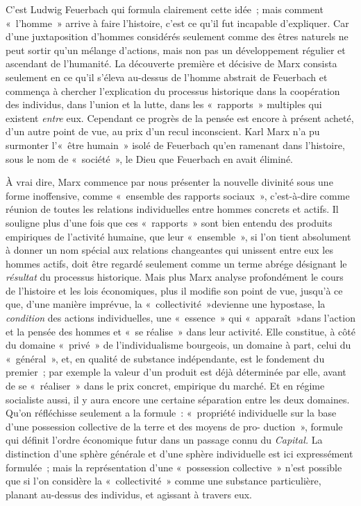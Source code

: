 \documentclass[french,twoside]{book} %
\begin{document}
C'est Ludwig Feuerbach qui formula clairement cette idée ; mais comment « l'homme » arrive à faire l'histoire, c'est ce qu'il fut incapable d'expliquer. Car d'une juxtaposition d'hommes considérés seulement comme des êtres naturels ne peut sortir qu'un mélange d'actions, mais non pas un développement régulier et ascendant de l'humanité. La découverte première et décisive de Marx consista seulement en ce qu'il s'éleva au-dessus de l'homme abstrait de Feuerbach et commença à chercher l'explication du processus historique dans la coopération des individus, dans l'union et la lutte, dans les « rapports » multiples qui existent {\itshape entre} eux. Cependant ce progrès de la pensée est encore à présent acheté, d'un autre point de vue, au prix d'un recul inconscient. Karl Marx n'a pu surmonter l'« être humain » isolé de Feuerbach qu'en ramenant dans l'histoire, sous le nom de « société », le Dieu que Feuerbach en avait éliminé.\par
À vrai dire, Marx commence par nous présenter la nouvelle divinité sous une forme inoffensive, comme « ensemble des rapports sociaux », c'est-à-dire comme réunion de toutes les relations individuelles entre hommes concrets et actifs. Il souligne plus d'une fois que ces « rapports » sont bien entendu des produits empiriques de l'activité humaine, que leur « ensemble », si l'on tient absolument à donner un nom spécial aux relations changeantes qui unissent entre eux les hommes actifs, doit être regardé seulement comme un terme abrége désignant le {\itshape résultat} du processus historique. Mais plus Marx analyse profondément le cours de l'histoire et les lois économiques, plus il modifie son point de vue, jusqu'à ce que, d'une manière imprévue, la « collectivité »devienne une hypostase, la {\itshape condition} des actions individuelles, une « essence » qui « apparaît »dans l'action et la pensée des hommes et « se réalise » dans leur activité. Elle constitue, à côté du domaine « privé » de l'individualisme bourgeois, un domaine à part, celui du « général », et, en qualité de substance indépendante, est le fondement du premier ; par exemple la valeur d'un produit est déjà déterminée par elle, avant de se « réaliser » dans le prix concret, empirique du marché. Et en régime socialiste aussi, il y aura encore une certaine séparation entre les deux domaines. Qu'on réfléchisse seulement a la formule : « propriété individuelle sur la base d'une possession collective de la terre et des moyens de pro- duction », formule qui définit l'ordre économique futur dans un passage connu du {\itshape Capital.} La distinction d'une sphère générale et d'une sphère individuelle est ici expressément formulée ; mais la représentation d'une « possession collective » n'est possible que si l’on considère la « collectivité » comme une substance particulière, planant au-dessus des individus, et agissant à travers eux.\par
\end{document}
